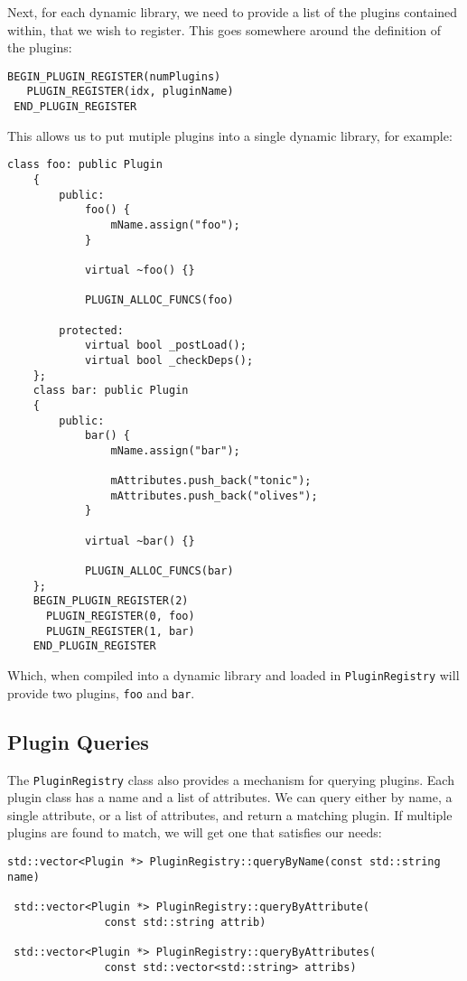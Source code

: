 Next, for each dynamic library, we need to provide a list of the
plugins contained within, that we wish to register.  This goes
somewhere around the definition of the plugins:

\begin{lstlisting}[frame=single]
 BEGIN_PLUGIN_REGISTER(numPlugins)
   PLUGIN_REGISTER(idx, pluginName)
 END_PLUGIN_REGISTER
\end{lstlisting}


This allows us to put mutiple plugins into a single dynamic library, 
for example:

\begin{lstlisting}[frame=single]
    class foo: public Plugin
    {
        public:
            foo() {
                mName.assign("foo");
            }

            virtual ~foo() {}

            PLUGIN_ALLOC_FUNCS(foo)

        protected:
            virtual bool _postLoad();
            virtual bool _checkDeps();
    };
    class bar: public Plugin
    {
        public:
            bar() {
                mName.assign("bar");

                mAttributes.push_back("tonic");
                mAttributes.push_back("olives");
            }

            virtual ~bar() {}

            PLUGIN_ALLOC_FUNCS(bar)
    };
    BEGIN_PLUGIN_REGISTER(2)
      PLUGIN_REGISTER(0, foo)
      PLUGIN_REGISTER(1, bar)
    END_PLUGIN_REGISTER 
\end{lstlisting} 

Which, when compiled into a dynamic library and loaded in {\tt PluginRegistry}
will provide two plugins, {\tt foo} and {\tt bar}.



\subsection{Plugin Queries}

The {\tt PluginRegistry} class also provides a mechanism for querying
plugins. Each plugin class has a name and a list of attributes. We
can query either by name, a single attribute, or a list of attributes,
and return a matching plugin. If multiple plugins are found to match,
we will get one that satisfies our needs:

\begin{lstlisting}[frame=single]
 std::vector<Plugin *> PluginRegistry::queryByName(const std::string name)

 std::vector<Plugin *> PluginRegistry::queryByAttribute(
               const std::string attrib)

 std::vector<Plugin *> PluginRegistry::queryByAttributes(
               const std::vector<std::string> attribs)
\end{lstlisting}

